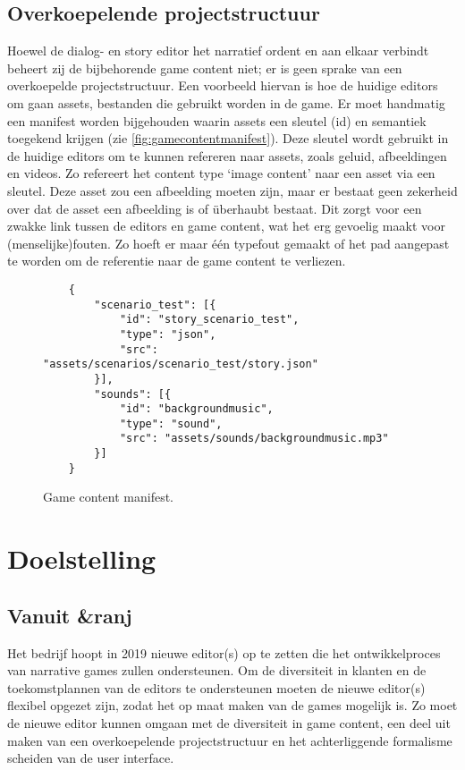 \subsection{Overkoepelende projectstructuur}
Hoewel de dialog- en story editor het narratief ordent en aan elkaar verbindt beheert zij de bijbehorende game content niet; er is geen sprake van een overkoepelde projectstructuur. Een voorbeeld hiervan is hoe de huidige editors om gaan assets, bestanden die gebruikt worden in de game. Er moet handmatig een manifest worden bijgehouden waarin assets een sleutel (id) en semantiek toegekend krijgen (zie \autoref{fig:gamecontentmanifest}). Deze sleutel wordt gebruikt in de huidige editors om te kunnen refereren naar assets, zoals geluid, afbeeldingen en videos. Zo refereert het content type ‘image content’ naar een asset via een sleutel. Deze asset zou een afbeelding moeten zijn, maar er bestaat geen zekerheid over dat de asset een afbeelding is of überhaubt bestaat. Dit zorgt voor een zwakke link tussen de editors en game content, wat het erg gevoelig maakt voor (menselijke)fouten. Zo hoeft er maar één typefout gemaakt of het pad aangepast te worden om de referentie naar de game content te verliezen.

\begin{figure}[htb]
    \centering
    \lstset{language=JSON}
    \begin{lstlisting}
    {
        "scenario_test": [{
            "id": "story_scenario_test",
            "type": "json",
            "src": "assets/scenarios/scenario_test/story.json"
        }],
        "sounds": [{
            "id": "backgroundmusic",
            "type": "sound",
            "src": "assets/sounds/backgroundmusic.mp3"
        }]
    }
    \end{lstlisting}
    \caption{Game content manifest.}
    \label{fig:gamecontentmanifest}
\end{figure}

\pagebreak
\section{Doelstelling}
\label{sec:doelstelling}
\subsection{Vanuit \&ranj}
Het bedrijf hoopt in 2019 nieuwe editor(s) op te zetten die het ontwikkelproces van narrative games zullen ondersteunen. Om de diversiteit in klanten en de toekomstplannen van de editors te ondersteunen moeten de nieuwe editor(s) flexibel opgezet zijn, zodat het op maat maken van de games mogelijk is. Zo moet de nieuwe editor kunnen omgaan met de diversiteit in game content, een deel uit maken van een overkoepelende projectstructuur en het achterliggende formalisme scheiden van de user interface.


